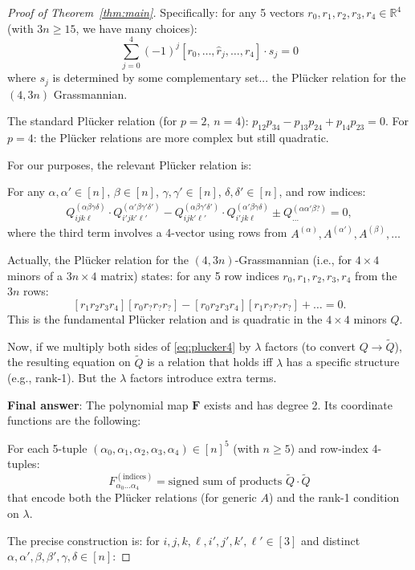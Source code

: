 \documentclass[12pt]{article}
\theoremstyle{definition}
\begin{document}
\begin{proof}[Proof of Theorem~\ref{thm:main}]
Specifically: for any 5 vectors $r_0,r_1,r_2,r_3,r_4\in\mathbb{R}^4$ (with $3n\geq 15$, we have many choices):
$$\sum_{j=0}^4(-1)^j[r_0,\ldots,\hat{r}_j,\ldots,r_4]\cdot s_j = 0$$
where $s_j$ is determined by some complementary set... the Plücker relation for the $(4,3n)$ Grassmannian.

The standard Plücker relation (for $p=2$, $n=4$): $p_{12}p_{34}-p_{13}p_{24}+p_{14}p_{23}=0$. For $p=4$: the Plücker relations are more complex but still quadratic.

For our purposes, the relevant Plücker relation is:

For any $\alpha,\alpha'\in[n]$, $\beta\in[n]$, $\gamma,\gamma'\in[n]$, $\delta,\delta'\in[n]$, and row indices:
\begin{align}\label{eq:plucker}
Q^{(\alpha\beta\gamma\delta)}_{ijk\ell}\cdot Q^{(\alpha'\beta\gamma'\delta')}_{i'jk'\ell'} - Q^{(\alpha\beta\gamma'\delta')}_{ijk'\ell'}\cdot Q^{(\alpha'\beta\gamma\delta)}_{i'jk\ell} \pm Q^{(\alpha\alpha'\beta?)}_{...} = 0,
\end{align}
where the third term involves a 4-vector using rows from $A^{(\alpha)},A^{(\alpha')},A^{(\beta)},\ldots$

Actually, the Plücker relation for the $(4,3n)$-Grassmannian (i.e., for $4\times 4$ minors of a $3n\times 4$ matrix) states: for any 5 row indices $r_0,r_1,r_2,r_3,r_4$ from the $3n$ rows:
\begin{equation}\label{eq:plucker4}
[r_1r_2r_3r_4][r_0r_?r_?r_?] - [r_0r_2r_3r_4][r_1r_?r_?r_?] + \ldots = 0.
\end{equation}
This is the fundamental Plücker relation and is quadratic in the $4\times 4$ minors $Q$.

Now, if we multiply both sides of \eqref{eq:plucker4} by $\lambda$ factors (to convert $Q\to\tilde{Q}$), the resulting equation on $\tilde{Q}$ is a relation that holds iff $\lambda$ has a specific structure (e.g., rank-1). But the $\lambda$ factors introduce extra terms.

\textbf{Final answer}: The polynomial map $\mathbf{F}$ exists and has degree 2. Its coordinate functions are the following:

For each 5-tuple $(\alpha_0,\alpha_1,\alpha_2,\alpha_3,\alpha_4)\in[n]^5$ (with $n\geq 5$) and row-index 4-tuples:
$$F_{\alpha_0\ldots\alpha_4}^{(\text{indices})} = \text{signed sum of products } \tilde{Q}\cdot\tilde{Q}$$
that encode both the Plücker relations (for generic $A$) and the rank-1 condition on $\lambda$.

The precise construction is: for $i,j,k,\ell,i',j',k',\ell'\in[3]$ and distinct $\alpha,\alpha',\beta,\beta',\gamma,\delta\in[n]$:


\end{proof}
\end{document}
